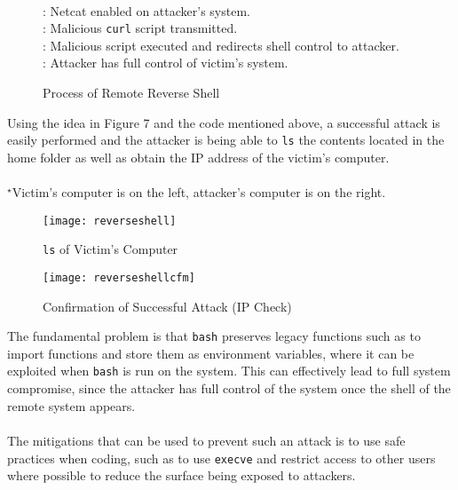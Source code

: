 \documentclass[a4paper,12pt]{article}
\newcommand*\circled[1]{\tikz[baseline=(char.base)]{
		\node[shape=circle,draw,inner sep=2pt] (char) {#1};}}
\begin{document}
\begin{figure}[H]
	{	\centering
		\\
	}
	\circled{1}: Netcat enabled on attacker's system.\\
	\circled{2}: Malicious \texttt{curl} script transmitted.\\
	\circled{3}: Malicious script executed and redirects shell control to attacker.\\
	\circled{4}: Attacker has full control of victim's system.
	\caption{Process of Remote Reverse Shell}
\end{figure}
\noindent Using the idea in Figure 7 and the code mentioned above, a successful attack is easily performed and the attacker is being able to \texttt{ls} the contents located in the home folder as well as obtain the IP address of the victim's computer.\\\\$^\star$Victim's computer is on the left, attacker's computer is on the right.
\begin{figure}[H]
	\centering
	\texttt{[image: reverseshell]}
	\caption{\texttt{ls} of Victim's Computer}
	\label{fig:reverseshell}
\end{figure}
\begin{figure}[H]
	\centering
	\texttt{[image: reverseshellcfm]}
	\caption{Confirmation of Successful Attack (IP Check)}
	\label{fig:reverseshellcfm}
\end{figure}
\noindent The fundamental problem is that \texttt{bash} preserves legacy functions such as to import functions and store them as environment variables, where it can be exploited when \texttt{bash} is run on the system. This can effectively lead to full system compromise, since the attacker has full control of the system once the shell of the remote system appears.\\\\The mitigations that can be used to prevent such an attack is to use safe practices when coding, such as to use \texttt{execve} and restrict access to other users where possible to reduce the surface being exposed to attackers.
\newpage
\end{document}
